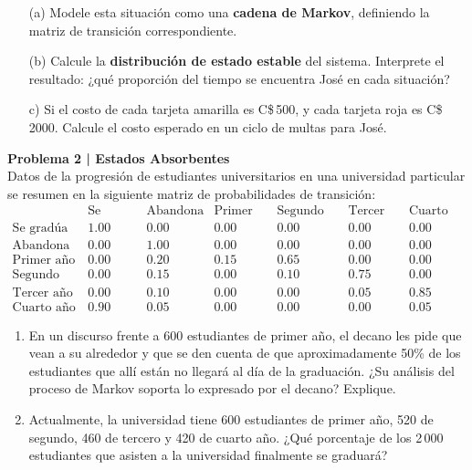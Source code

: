 \documentclass{article}
\begin{document}
\begin{problem}
\begin{enumerate}
    \item[(a)] Modele esta situación como una \textbf{cadena de Markov}, definiendo la matriz de transición correspondiente.
    
    \item[(b)] Calcule la \textbf{distribución de estado estable} del sistema. Interprete el resultado: ¿qué proporción del tiempo se encuentra José en cada situación?

    \item[c)] Si el costo de cada tarjeta amarilla es C\$\,500, y cada tarjeta roja es C\$\, 2000. Calcule el costo esperado en un ciclo de multas para José. 
\end{enumerate}
\end{problem}
\vspace{-.7cm}
\begin{problem}
\textbf{Problema 2 | Estados Absorbentes}\\
Datos de la progresión de estudiantes universitarios en una universidad
particular se resumen en la siguiente matriz de probabilidades de transición:
\[
\begin{array}{c|cccccc}
      & \text{Se gradúa} & \text{Abandona} & \text{Primer año} & \text{Segundo año} & \text{Tercer año} & \text{Cuarto año}\\\hline
\text{Se gradúa} & 1.00 & 0.00 & 0.00 & 0.00 & 0.00 & 0.00\\
\text{Abandona}  & 0.00 & 1.00 & 0.00 & 0.00 & 0.00 & 0.00\\
\text{Primer año}& 0.00 & 0.20 & 0.15 & 0.65 & 0.00 & 0.00\\
\text{Segundo año}& 0.00 & 0.15 & 0.00 & 0.10 & 0.75 & 0.00\\
\text{Tercer año}& 0.00 & 0.10 & 0.00 & 0.00 & 0.05 & 0.85\\
\text{Cuarto año}& 0.90 & 0.05 & 0.00 & 0.00 & 0.00 & 0.05
\end{array}
\]

\begin{enumerate}
\item En un discurso frente a 600 estudiantes de primer año, el decano les pide que vean a su alrededor y que se den cuenta de que aproximadamente 50\% de los estudiantes que allí están no llegará al día de la graduación. ¿Su análisis del proceso de Markov soporta lo expresado por el decano? Explique.
\item Actualmente, la universidad tiene 600 estudiantes de primer año, 520 de segundo, 460 de tercero y 420 de cuarto año. ¿Qué porcentaje de los 2\,000 estudiantes que asisten a la universidad finalmente se graduará?
\end{enumerate}
\end{problem}
\end{document}
